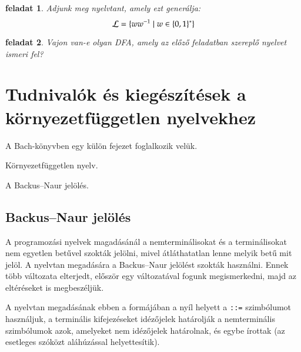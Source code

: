 \documentclass[a4paper]{article}
\newtheorem{feladat}{feladat}[section]
\begin{document}
\begin{feladat}
Adjunk meg nyelvtant, amely ezt generálja:
\[{\cal L}=\{ww^{-1} \mid w\in \{0,1\}^*\}\]
\end{feladat}

\begin{feladat}
Vajon van-e olyan DFA, amely az előző feladatban szereplő nyelvet ismeri fel?
\end{feladat}

\section{Tudnivalók és kiegészítések a környezetfüggetlen nyelvekhez}

A Bach-könyvben egy külön fejezet foglalkozik velük.

Környezetfüggetlen nyelv.

A Backus--Naur jelölés.

\subsection{Backus--Naur jelölés}

A programozási nyelvek magadásánál a nemterminálisokat és a
terminálisokat nem egyetlen betűvel szokták jelölni, mivel átláthatatlan
lenne melyik betű mit jelöl. A nyelvtan megadására a Backus--Naur
jelölést szokták használni. Ennek több változata elterjedt, először egy
változatával fogunk megismerkedni, majd az eltéréseket is megbeszéljük.

A nyelvtan megadásának ebben a formájában a nyíl helyett a \verb|::=|
szimbólumot használjuk, a terminális kifejezéseket idézőjelek határolják a
nemterminális szimbólumok azok, amelyeket nem idézőjelek határolnak, és egybe
írottak (az esetleges szóközt aláhúzással helyettesítik).
\end{document}
